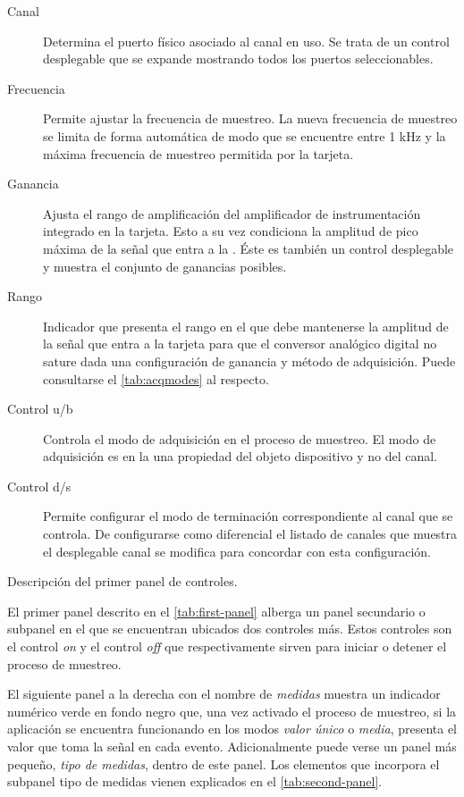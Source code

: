 \begin{table}
	\centering
	\begin{minipage}{.85\textwidth}
		\begin{description}
			\item[Canal] Determina el puerto físico asociado al
				canal en uso. Se trata de un control
				desplegable que se expande mostrando todos
				los puertos seleccionables.
			\item[Frecuencia] Permite ajustar la frecuencia de
				muestreo. La nueva frecuencia de muestreo
				se limita de forma automática de modo que
				se encuentre entre 1 kHz y la máxima
				frecuencia de muestreo permitida por la
				tarjeta.
			\item[Ganancia] Ajusta el rango de amplificación
				del amplificador de instrumentación
				integrado en la tarjeta. Esto a su vez
				condiciona la amplitud de pico máxima de la
				señal que entra a la \kpci{}. Éste es
				también un control desplegable y muestra el
				conjunto de ganancias posibles.
			\item[Rango] Indicador que presenta el rango en el
				que debe mantenerse la amplitud de la señal
				que entra a la tarjeta para que el
				conversor analógico digital no sature dada
				una configuración de ganancia y método de
				adquisición. Puede consultarse el
				\vref{tab:acqmodes} al respecto.
			\item[Control u/b] Controla el modo de adquisición
				en el proceso de muestreo. El modo de
				adquisición es en la \datx{} una propiedad
				del objeto dispositivo y no del canal.
			\item[Control d/s] Permite configurar el modo de
				terminación correspondiente al canal que se
				controla. De configurarse como diferencial
				el listado de canales que muestra el
				desplegable \textsf{canal} se modifica para
				concordar con esta configuración.
		\end{description}
	\end{minipage}
	\caption[Descripción del primer panel de controles]{Descripción del
	primer panel de controles.}
	\label{tab:first-panel}
\end{table}

El primer panel descrito en el \vref{tab:first-panel} alberga un panel
secundario o subpanel en el que se encuentran ubicados dos controles más.
Estos controles son el control \emph{on} y el control \emph{off} que
respectivamente sirven para iniciar o detener el proceso de muestreo.

El siguiente panel a la derecha con el nombre de \emph{medidas} muestra un
indicador numérico verde en fondo negro que, una vez activado el proceso de
muestreo, si la aplicación se encuentra funcionando en los modos
\emph{valor único} o \emph{media}, presenta el valor que toma la señal en
cada evento. Adicionalmente puede verse un panel más pequeño, \emph{tipo de
medidas}, dentro de este panel. Los elementos que incorpora el subpanel
tipo de medidas vienen explicados en el \vref{tab:second-panel}.

